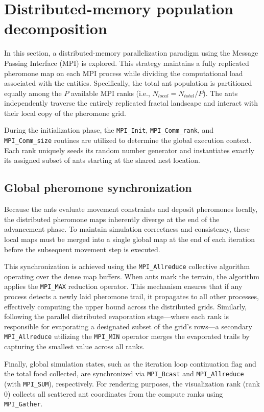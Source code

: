 \section{Distributed-memory population decomposition}

In this section, a distributed-memory parallelization paradigm using the Message Passing Interface (MPI) is explored. This strategy maintains a fully replicated pheromone map on each MPI process while dividing the computational load associated with the entities. Specifically, the total ant population is partitioned equally among the $P$ available MPI ranks (i.e., $N_{local} = N_{total}/P$). The ants independently traverse the entirely replicated fractal landscape and interact with their local copy of the pheromone grid.

During the initialization phase, the \texttt{MPI\_Init}, \texttt{MPI\_Comm\_rank}, and \texttt{MPI\_Comm\_size} routines are utilized to determine the global execution context. Each rank uniquely seeds its random number generator and instantiates exactly its assigned subset of ants starting at the shared nest location.

\subsection{Global pheromone synchronization}

Because the ants evaluate movement constraints and deposit pheromones locally, the distributed pheromone maps inherently diverge at the end of the advancement phase. To maintain simulation correctness and consistency, these local maps must be merged into a single global map at the end of each iteration before the subsequent movement step is executed.

This synchronization is achieved using the \texttt{MPI\_Allreduce} collective algorithm operating over the dense map buffers. When ants mark the terrain, the algorithm applies the \texttt{MPI\_MAX} reduction operator. This mechanism ensures that if any process detects a newly laid pheromone trail, it propagates to all other processes, effectively computing the upper bound across the distributed grids. Similarly, following the parallel distributed evaporation stage—where each rank is responsible for evaporating a designated subset of the grid's rows—a secondary \texttt{MPI\_Allreduce} utilizing the \texttt{MPI\_MIN} operator merges the evaporated trails by capturing the smallest value across all ranks.

Finally, global simulation states, such as the iteration loop continuation flag and the total food collected, are synchronized via \texttt{MPI\_Bcast} and \texttt{MPI\_Allreduce} (with \texttt{MPI\_SUM}), respectively. For rendering purposes, the visualization rank (rank 0) collects all scattered ant coordinates from the compute ranks using \texttt{MPI\_Gather}.

